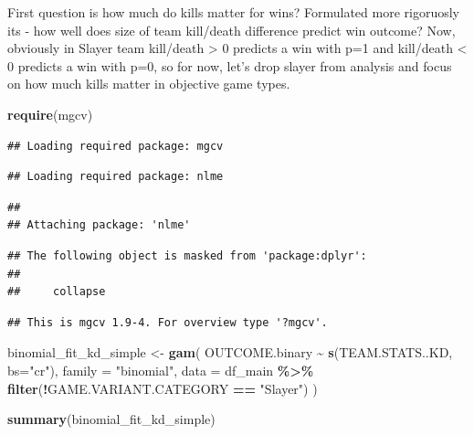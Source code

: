 \documentclass[
]{article}
\newenvironment{Shaded}{\begin{snugshade}}{\end{snugshade}}
\newcommand{\AttributeTok}[1]{\textcolor[rgb]{0.13,0.29,0.53}{#1}}
\newcommand{\FunctionTok}[1]{\textcolor[rgb]{0.13,0.29,0.53}{\textbf{#1}}}
\newcommand{\NormalTok}[1]{#1}
\newcommand{\OtherTok}[1]{\textcolor[rgb]{0.56,0.35,0.01}{#1}}
\newcommand{\SpecialCharTok}[1]{\textcolor[rgb]{0.81,0.36,0.00}{\textbf{#1}}}
\newcommand{\StringTok}[1]{\textcolor[rgb]{0.31,0.60,0.02}{#1}}
\begin{document}
First question is how much do kills matter for wins? Formulated more
rigoruosly its - how well does size of team kill/death difference
predict win outcome? Now, obviously in Slayer team kill/death
\textgreater{} 0 predicts a win with p=1 and kill/death \textless{} 0
predicts a win with p=0, so for now, let's drop slayer from analysis and
focus on how much kills matter in objective game types.

\begin{Shaded}
\begin{Highlighting}[]
\FunctionTok{require}\NormalTok{(mgcv)}
\end{Highlighting}
\end{Shaded}

\begin{verbatim}
## Loading required package: mgcv
\end{verbatim}

\begin{verbatim}
## Loading required package: nlme
\end{verbatim}

\begin{verbatim}
## 
## Attaching package: 'nlme'
\end{verbatim}

\begin{verbatim}
## The following object is masked from 'package:dplyr':
## 
##     collapse
\end{verbatim}

\begin{verbatim}
## This is mgcv 1.9-4. For overview type '?mgcv'.
\end{verbatim}

\begin{Shaded}
\begin{Highlighting}[]
\NormalTok{binomial\_fit\_kd\_simple }\OtherTok{\textless{}{-}} \FunctionTok{gam}\NormalTok{(}
\NormalTok{  OUTCOME.binary }\SpecialCharTok{\textasciitilde{}} \FunctionTok{s}\NormalTok{(TEAM.STATS..KD, }\AttributeTok{bs=}\StringTok{"cr"}\NormalTok{),}
  \AttributeTok{family =} \StringTok{"binomial"}\NormalTok{,}
  \AttributeTok{data =}\NormalTok{ df\_main }\SpecialCharTok{\%\textgreater{}\%} 
    \FunctionTok{filter}\NormalTok{(}\SpecialCharTok{!}\NormalTok{GAME.VARIANT.CATEGORY }\SpecialCharTok{==} \StringTok{"Slayer"}\NormalTok{)}
\NormalTok{)}
\end{Highlighting}
\end{Shaded}

\begin{Shaded}
\begin{Highlighting}[]
\FunctionTok{summary}\NormalTok{(binomial\_fit\_kd\_simple)}
\end{Highlighting}
\end{Shaded}
\end{document}
